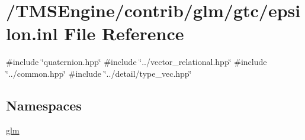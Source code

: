 \hypertarget{epsilon_8inl}{}\section{/\+T\+M\+S\+Engine/contrib/glm/gtc/epsilon.inl File Reference}
\label{epsilon_8inl}
{\ttfamily \#include \char`\"{}quaternion.\+hpp\char`\"{}}\newline
{\ttfamily \#include \char`\"{}../vector\+\_\+relational.\+hpp\char`\"{}}\newline
{\ttfamily \#include \char`\"{}../common.\+hpp\char`\"{}}\newline
{\ttfamily \#include \char`\"{}../detail/type\+\_\+vec.\+hpp\char`\"{}}\newline
\subsection*{Namespaces}
\begin{DoxyCompactItemize}
\item 
 \hyperlink{namespaceglm}{glm}
\end{DoxyCompactItemize}
